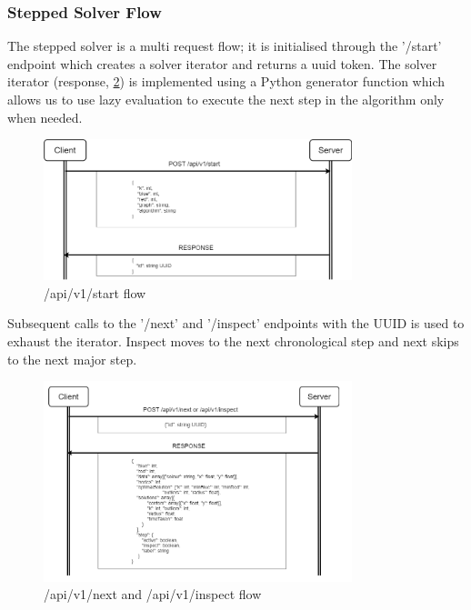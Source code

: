 \subsubsection{Stepped Solver Flow}
The stepped solver is a multi request flow; it is initialised through the '/start' endpoint which creates a solver iterator and returns a \acrshort{uuid} token. The solver iterator (response, \cref{fig:stepped_next_inspect_request}) is implemented using a Python generator function which allows us to use lazy evaluation to execute the next step in the algorithm only when needed.
\begin{figure}[H]
    \centering
    \includegraphics[width=0.8\textwidth]{images/stepped_solver_ui/start_stepped_flow.png}
    \caption{/api/v1/start flow}
    \label{fig:stepped_start_request}
\end{figure}

Subsequent calls to the '/next' and '/inspect' endpoints with the UUID is used to exhaust the iterator. Inspect moves to the next chronological step and next skips to the next major step.
\begin{figure}[H]
    \centering
    \includegraphics[width=0.8\textwidth]{images/stepped_solver_ui/next_inspect_stepped_flow.png}
    \caption{/api/v1/next and /api/v1/inspect flow}
    \label{fig:stepped_next_inspect_request}
\end{figure}

%